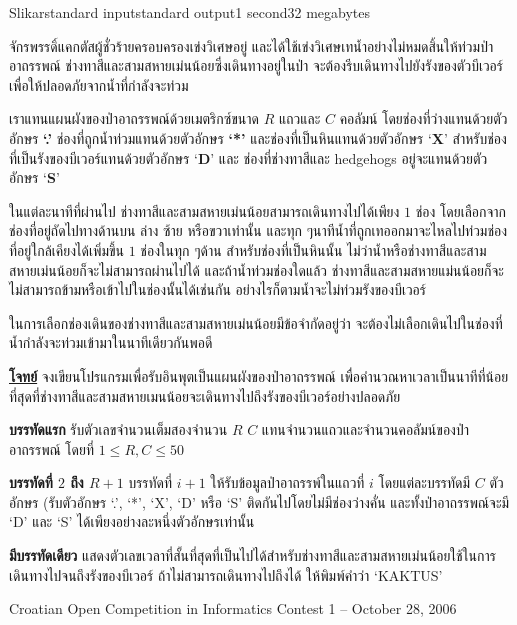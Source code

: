 \documentclass[11pt,a4paper]{article}
\begin{document}
\begin{problem}{Slikar}{standard input}{standard output}{1 second}{32  megabytes}

จักรพรรดิ์แคกตัสผู้ชั่วร้ายครอบครองเข่งวิเศษอยู่ และได้ใช้เข่งวิเศษเทน้ำอย่างไม่หมดสิ้นให้ท่วมป่าอาถรรพณ์ ช่างทาสีและสามสหายเม่นน้อยซึ่งเดินทางอยู่ในป่า จะต้องรีบเดินทางไปยังรังของตัวบีเวอร์เพื่อให้ปลอดภัยจากน้ำที่กำลังจะท่วม

เราแทนแผนผังของป่าอาถรรพณ์ด้วยเมตริกซ์ขนาด $R$ แถวและ $C$ คอลัมน์ โดยช่องที่ว่างแทนด้วยตัวอักษร \textbf{‘.’} ช่องที่ถูกน้ำท่วมแทนด้วยตัวอักษร \textbf{‘*’} และช่องที่เป็นหินแทนด้วยตัวอักษร ‘\textbf{X}’ สำหรับช่องที่เป็นรังของบีเวอร์แทนด้วยตัวอักษร ‘\textbf{D}’ และ ช่องที่ช่างทาสีและ hedgehogs อยู่จะแทนด้วยตัวอักษร ‘\textbf{S}’

ในแต่ละนาทีที่ผ่านไป ช่างทาสีและสามสหายเม่นน้อยสามารถเดินทางไปได้เพียง $1$ ช่อง โดยเลือกจากช่องที่อยู่ถัดไปทางด้านบน ล่าง ซ้าย หรือขวาเท่านั้น และทุก ๆนาทีน้ำที่ถูกเทออกมาจะไหลไปท่วมช่องที่อยู่ใกล้เคียงได้เพิ่มขึ้น $1$ ช่องในทุก ๆด้าน สำหรับช่องที่เป็นหินนั้น ไม่ว่าน้ำหรือช่างทาสีและสามสหายเม่นน้อยก็จะไม่สามารถผ่านไปได้ และถ้าน้ำท่วมช่องใดแล้ว ช่างทาสีและสามสหายแม่นน้อยก็จะไม่สามารถข้ามหรือเข้าไปในช่องนั้นได้เช่นกัน  อย่างไรก็ตามน้ำจะไม่ท่วมรังของบีเวอร์

ในการเลือกช่องเดินของช่างทาสีและสามสหายเม่นน้อยมีข้อจำกัดอยู่ว่า จะต้องไม่เลือกเดินไปในช่องที่น้ำกำลังจะท่วมเข้ามาในนาทีเดียวกันพอดี

\bigskip
\underline{\textbf{โจทย์}}  จงเขียนโปรแกรมเพื่อรับอินพุตเป็นแผนผังของป่าอาถรรพณ์ เพื่อคำนวณหาเวลาเป็นนาทีที่น้อยที่สุดที่ช่างทาสีและสามสหายเมนน้อยจะเดินทางไปถึงรังของบีเวอร์อย่างปลอดภัย

\InputFile

\textbf{บรรทัดแรก} รับตัวเลขจำนวนเต็มสองจำนวน $R$ $C$ แทนจำนวนแถวและจำนวนคอลัมน์ของป่าอาถรรพณ์ โดยที่ $ 1 \leq R,C \leq 50$

\textbf{บรรทัดที่ $2$ ถึง $R+1$ }บรรทัดที่ $i+1$ ให้รับข้อมูลป่าอาถรรพ์ในแถวที่ $i$ โดยแต่ละบรรทัดมี $C$ ตัวอักษร (รับตัวอักษร ‘.’, ‘*’, ‘X’, ‘D’ หรือ ‘S’ ติดกันไปโดยไม่มีช่องว่างคั่น และทั้งป่าอาถรรพณ์จะมี ‘D’ และ ‘S’ ได้เพียงอย่างละหนึ่งตัวอักษรเท่านั้น


\OutputFile

\textbf{มีบรรทัดเดียว} แสดงตัวเลขเวลาที่สั้นที่สุดที่เป็นไปได้สำหรับช่างทาสีและสามสหายเม่นน้อยใช้ในการเดินทางไปจนถึงรังของบีเวอร์ ถ้าไม่สามารถเดินทางไปถึงได้ ให้พิมพ์คำว่า ‘KAKTUS’


\Examples

\begin{example}
%
%
%
\end{example}


\Source

Croatian Open Competition in Informatics
Contest 1 – October 28, 2006

\end{problem}
\end{document}
